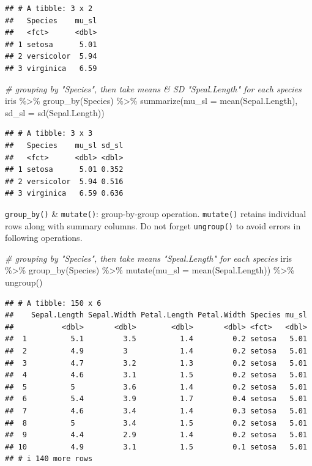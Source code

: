\documentclass[
]{article}
\newenvironment{Shaded}{\begin{snugshade}}{\end{snugshade}}
\newcommand{\AttributeTok}[1]{\textcolor[rgb]{0.77,0.63,0.00}{#1}}
\newcommand{\CommentTok}[1]{\textcolor[rgb]{0.56,0.35,0.01}{\textit{#1}}}
\newcommand{\FunctionTok}[1]{\textcolor[rgb]{0.00,0.00,0.00}{#1}}
\newcommand{\NormalTok}[1]{#1}
\newcommand{\SpecialCharTok}[1]{\textcolor[rgb]{0.00,0.00,0.00}{#1}}
\begin{document}
\begin{verbatim}
## # A tibble: 3 x 2
##   Species    mu_sl
##   <fct>      <dbl>
## 1 setosa      5.01
## 2 versicolor  5.94
## 3 virginica   6.59
\end{verbatim}

\begin{Shaded}
\begin{Highlighting}[]
\CommentTok{\# grouping by "Species", then take means \& SD "Speal.Length" for each species}
\NormalTok{iris }\SpecialCharTok{\%\textgreater{}\%} 
  \FunctionTok{group\_by}\NormalTok{(Species) }\SpecialCharTok{\%\textgreater{}\%} 
  \FunctionTok{summarize}\NormalTok{(}\AttributeTok{mu\_sl =} \FunctionTok{mean}\NormalTok{(Sepal.Length),}
            \AttributeTok{sd\_sl =} \FunctionTok{sd}\NormalTok{(Sepal.Length))}
\end{Highlighting}
\end{Shaded}

\begin{verbatim}
## # A tibble: 3 x 3
##   Species    mu_sl sd_sl
##   <fct>      <dbl> <dbl>
## 1 setosa      5.01 0.352
## 2 versicolor  5.94 0.516
## 3 virginica   6.59 0.636
\end{verbatim}

\texttt{group\_by()} \& \texttt{mutate()}: group-by-group operation. \texttt{mutate()} retains individual rows along with summary columns. Do not forget \texttt{ungroup()} to avoid errors in following operations.

\begin{Shaded}
\begin{Highlighting}[]
\CommentTok{\# grouping by "Species", then take means "Speal.Length" for each species}
\NormalTok{iris }\SpecialCharTok{\%\textgreater{}\%} 
  \FunctionTok{group\_by}\NormalTok{(Species) }\SpecialCharTok{\%\textgreater{}\%} 
  \FunctionTok{mutate}\NormalTok{(}\AttributeTok{mu\_sl =} \FunctionTok{mean}\NormalTok{(Sepal.Length)) }\SpecialCharTok{\%\textgreater{}\%} 
  \FunctionTok{ungroup}\NormalTok{()}
\end{Highlighting}
\end{Shaded}

\begin{verbatim}
## # A tibble: 150 x 6
##    Sepal.Length Sepal.Width Petal.Length Petal.Width Species mu_sl
##           <dbl>       <dbl>        <dbl>       <dbl> <fct>   <dbl>
##  1          5.1         3.5          1.4         0.2 setosa   5.01
##  2          4.9         3            1.4         0.2 setosa   5.01
##  3          4.7         3.2          1.3         0.2 setosa   5.01
##  4          4.6         3.1          1.5         0.2 setosa   5.01
##  5          5           3.6          1.4         0.2 setosa   5.01
##  6          5.4         3.9          1.7         0.4 setosa   5.01
##  7          4.6         3.4          1.4         0.3 setosa   5.01
##  8          5           3.4          1.5         0.2 setosa   5.01
##  9          4.4         2.9          1.4         0.2 setosa   5.01
## 10          4.9         3.1          1.5         0.1 setosa   5.01
## # i 140 more rows
\end{verbatim}
\end{document}
